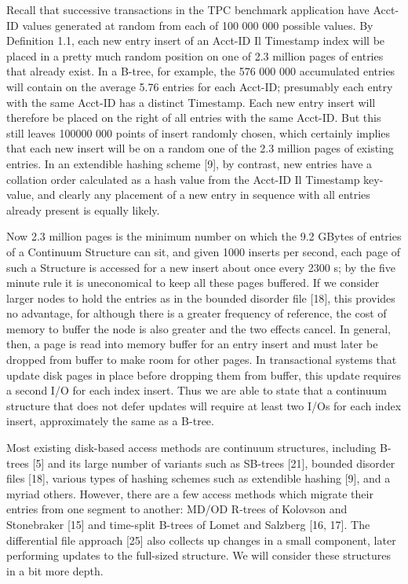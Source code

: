 \documentclass[a4paper,12pt,notitlepage,twoside,openright]{article}
\begin{document}
Recall that successive transactions in the TPC benchmark application
have Acct-ID values generated at random from each of 100 000 000
possible values. By Definition 1.1, each new entry insert of an Acct-ID
Il Timestamp index will be placed in a pretty much random position on
one of 2.3 million pages of entries that already exist. In a B-tree, for
example, the 576 000 000 accumulated entries will contain on the average
5.76 entries for each Acct-ID; presumably each entry with the same
Acct-ID has a distinct Timestamp. Each new entry insert will therefore
be placed on the right of all entries with the same Acct-ID. But this
still leaves 100000 000 points of insert randomly chosen, which
certainly implies that each new insert will be on a random one of the
2.3 million pages of existing entries. In an extendible hashing scheme
{[}9{]}, by contrast, new entries have a collation order calculated as a
hash value from the Acct-ID Il Timestamp key-value, and clearly any
placement of a new entry in sequence with all entries already present is
equally likely.

Now 2.3 million pages is the minimum number on which the 9.2 GBytes of
entries of a Continuum Structure can sit, and given 1000 inserts per
second, each page of such a Structure is accessed for a new insert about
once every 2300 s; by the five minute rule it is uneconomical to keep
all these pages buffered. If we consider larger nodes to hold the
entries as in the bounded disorder file {[}18{]}, this provides no
advantage, for although there is a greater frequency of reference, the
cost of memory to buffer the node is also greater and the two effects
cancel. In general, then, a page is read into memory buffer for an entry
insert and must later be dropped from buffer to make room for other
pages. In transactional systems that update disk pages in place before
dropping them from buffer, this update requires a second I/O for each
index insert. Thus we are able to state that a continuum structure that
does not defer updates will require at least two I/Os for each index
insert, approximately the same as a B-tree.

Most existing disk-based access
methods are continuum structures, including B-trees {[}5{]} and its
large number of variants such as SB-trees {[}21{]}, bounded disorder
files {[}18{]}, various types of hashing schemes such as extendible
hashing {[}9{]}, and a myriad others. However, there are a few access
methods which migrate their entries from one segment to another: MD/OD
R-trees of Kolovson and Stonebraker {[}15{]} and time-split B-trees of
Lomet and Salzberg {[}16, 17{]}. The differential file approach {[}25{]}
also collects up changes in a small component, later performing updates
to the full-sized structure. We will consider these structures in a bit
more depth.
\end{document}
